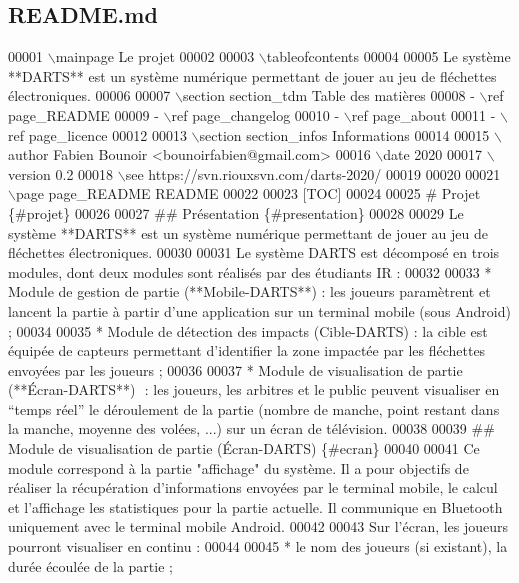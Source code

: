 \hypertarget{_r_e_a_d_m_e_8md_source}{}\subsection{R\+E\+A\+D\+M\+E.\+md}

\begin{DoxyCode}
00001 \(\backslash\)mainpage Le projet 
00002 
00003 \(\backslash\)tableofcontents
00004 
00005 Le système **DARTS** est un système numérique permettant de jouer au jeu de fléchettes électroniques.
00006 
00007 \(\backslash\)section section\_tdm Table des matières
00008 - \(\backslash\)ref page\_README
00009 - \(\backslash\)ref page\_changelog
00010 - \(\backslash\)ref page\_about
00011 - \(\backslash\)ref page\_licence
00012 
00013 \(\backslash\)section section\_infos Informations
00014 
00015 \(\backslash\)author Fabien Bounoir <bounoirfabien@gmail.com>
00016 \(\backslash\)date 2020
00017 \(\backslash\)version 0.2
00018 \(\backslash\)see https://svn.riouxsvn.com/darts-2020/
00019 
00020 
00021 \(\backslash\)page page\_README README
00022 
00023 [TOC]
00024 
00025 # Projet \{#projet\}
00026 
00027 ## Présentation \{#presentation\}
00028 
00029 Le système **DARTS** est un système numérique permettant de jouer au jeu de fléchettes électroniques.
00030 
00031 Le système DARTS est décomposé en trois modules, dont deux modules sont réalisés par des étudiants IR
       :
00032 
00033 * Module de gestion de partie​ (**Mobile-DARTS**)​ : les joueurs paramètrent et lancent la partie à
       partir d'une application sur un terminal mobile (sous Android) ;
00034 
00035 * Module de détection des impacts​ (Cible-DARTS)​ : la cible est équipée de capteurs permettant
       d'identifier la zone impactée par les fléchettes envoyées par les joueurs ;
00036 
00037 * Module de visualisation de partie​ (**Écran-DARTS**) ​ : les joueurs, les arbitres et le public
       peuvent visualiser en “temps réel” le déroulement de la partie (nombre de manche, point restant dans la manche,
       moyenne des volées, ...) sur un écran de télévision.
00038 
00039 ## Module de visualisation de partie (Écran-DARTS) \{#ecran\}
00040 
00041 Ce module correspond à la partie "affichage" du système. Il a pour objectifs de réaliser la
       récupération d'informations​ envoyées par le terminal mobile, ​le calcul et l'affichage les statistiques pour la
       partie actuelle. Il communique en Bluetooth uniquement avec le terminal mobile Android.
00042 
00043 Sur l'écran, les joueurs pourront visualiser en continu :
00044 
00045 * le nom des joueurs (si existant), la durée écoulée de la partie ;

\end{DoxyCode}
